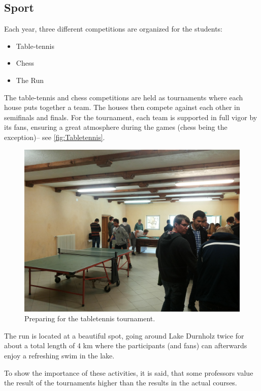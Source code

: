 \subsection{Sport}
Each year, three different competitions are organized for the students:
\begin{itemize}
\item Table-tennis
\item Chess
\item The Run
\end{itemize}
The table-tennis and chess competitions are held as tournaments where each house puts together a team. The houses then compete against each other in semifinals and finals. For the tournament, each team is supported in full vigor by its fans, ensuring a great atmosphere during the games (chess being the exception)-- see \autoref{fig:Tabletennis}. 
\begin{figure}[ht]%
 	\begin{center}%
 		\includegraphics[scale=0.06]{img/Tabletennis.jpg}%
 		\caption{Preparing for the tabletennis tournament.}\label{fig:Tabletennis}%
 	\end{center}%
\end{figure}

The run is located at a beautiful spot, going around Lake Durnholz twice for about a total length of 4 km where the participants (and fans) can afterwards enjoy a refreshing swim in the lake. 

To show the importance of these activities, it is said, that some professors value the result of the tournaments higher than the results in the actual courses.

